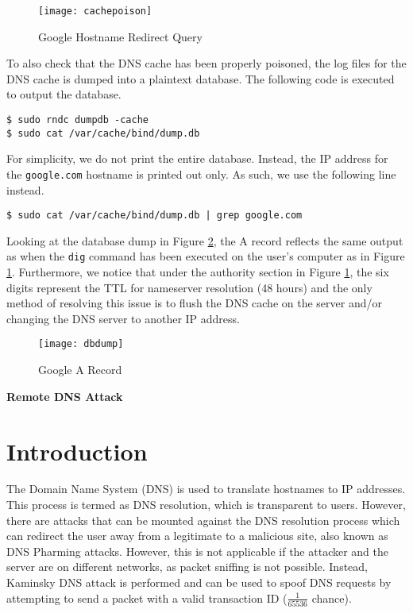 \documentclass[a4paper,12pt]{article}
\begin{document}
\begin{figure}[H]
\centering
\texttt{[image: cachepoison]}
\caption{Google Hostname Redirect Query}
\label{fig:cachepoison}
\end{figure}
\noindent To also check that the DNS cache has been properly poisoned, the log files for the DNS cache is dumped into a plaintext database. The following code is executed to output the database.
\begin{verbatim}
$ sudo rndc dumpdb -cache
$ sudo cat /var/cache/bind/dump.db
\end{verbatim}
For simplicity, we do not print the entire database. Instead, the IP address for the \texttt{google.com} hostname is printed out only. As such, we use the following line instead.
\begin{verbatim}
$ sudo cat /var/cache/bind/dump.db | grep google.com
\end{verbatim}
Looking at the database dump in Figure \ref{fig:dbdump}, the A record reflects the same output as when the \texttt{dig} command has been executed on the user's computer as in Figure \ref{fig:cachepoison}. Furthermore, we notice that under the authority section in Figure \ref{fig:cachepoison}, the six digits represent the TTL for nameserver resolution (48 hours) and the only method of resolving this issue is to flush the DNS cache on the server and/or changing the DNS server to another IP address.
\begin{figure}[H]
\centering
\texttt{[image: dbdump]}
\caption{Google A Record}
\label{fig:dbdump}
\end{figure}
\begin{titlepage}
		\begin{center}
		\vspace*{27em}
		\Huge
			\textbf{Remote DNS Attack}
			\vfill
		\end{center}
	\end{titlepage}
	
	\newpage
	\setcounter{section}{0}
	\section{Introduction}
	The Domain Name System (DNS) is used to translate hostnames to IP addresses. This process is termed as DNS resolution, which is transparent to users. However, there are attacks that can be mounted against the DNS resolution process which can redirect the user away from a legitimate to a malicious site, also known as DNS Pharming attacks. However, this is not applicable if the attacker and the server are on different networks, as packet sniffing is not possible. Instead, Kaminsky DNS attack is performed and can be used to spoof DNS requests by attempting to send a packet with a valid transaction ID ($\frac{1}{65536}$ chance).
\end{document}
